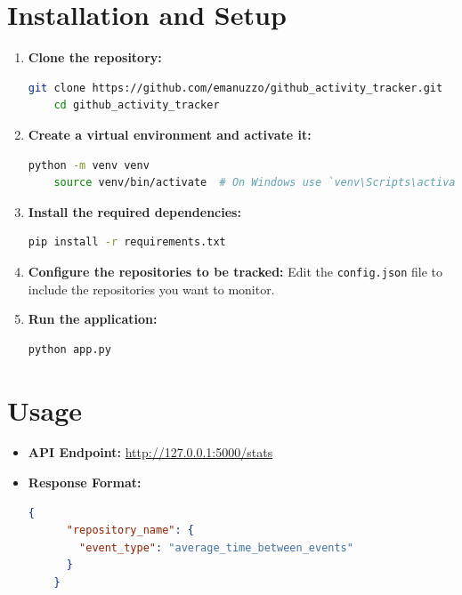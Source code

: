 \documentclass{article}
\begin{document}
\section{Installation and Setup}
\begin{enumerate}
    \item \textbf{Clone the repository:}
    \begin{lstlisting}[language=bash]
    git clone https://github.com/emanuzzo/github_activity_tracker.git
    cd github_activity_tracker
    \end{lstlisting}
    
    \item \textbf{Create a virtual environment and activate it:}
    \begin{lstlisting}[language=bash]
    python -m venv venv
    source venv/bin/activate  # On Windows use `venv\Scripts\activate`
    \end{lstlisting}
    
    \item \textbf{Install the required dependencies:}
    \begin{lstlisting}[language=bash]
    pip install -r requirements.txt
    \end{lstlisting}
    
    \item \textbf{Configure the repositories to be tracked:}
    Edit the \texttt{config.json} file to include the repositories you want to monitor.
    
    \item \textbf{Run the application:}
    \begin{lstlisting}[language=bash]
    python app.py
    \end{lstlisting}
\end{enumerate}

\section{Usage}
\begin{itemize}
    \item \textbf{API Endpoint:} \url{http://127.0.0.1:5000/stats}
    \item \textbf{Response Format:}
    \begin{lstlisting}[language=json]
    {
      "repository_name": {
        "event_type": "average_time_between_events"
      }
    }
    \end{lstlisting}
\end{itemize}
\end{document}
